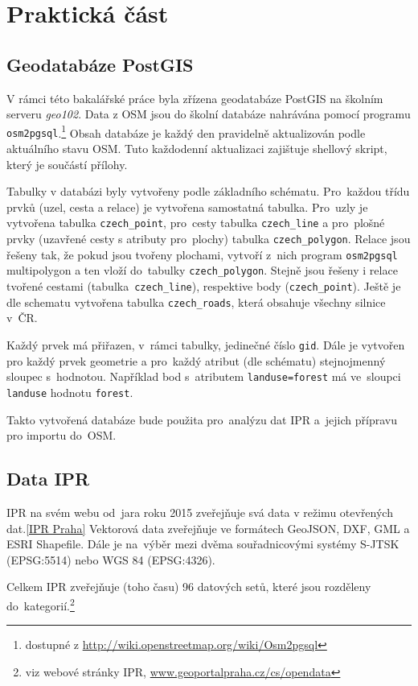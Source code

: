 \chapter{Praktická část}
\label{4-Praktická část}

\section{Geodatabáze PostGIS}
\label{Geodatabaze PostGIS} 
V rámci této bakalářské práce byla zřízena geodatabáze PostGIS na školním
serveru {\em geo102}. Data z OSM jsou do školní databáze nahrávána pomocí programu {\tt osm2pgsql}.\footnote{dostupné z \url{http://wiki.openstreetmap.org/wiki/Osm2pgsql}}
Obsah databáze je každý den pravidelně aktualizován podle aktuálního stavu OSM.
Tuto každodenní aktualizaci zajištuje shellový skript, který je součástí přílohy.

Tabulky v databázi byly vytvořeny podle základního schématu. Pro~každou třídu prvků (uzel, cesta
a relace) je vytvořena samostatná tabulka. Pro~uzly je vytvořena
tabulka {\tt czech\_point}, pro~cesty tabulka {\tt czech\_line} a pro~plošné prvky (uzavřené cesty s atributy
pro~plochy) tabulka {\tt czech\_polygon}. Relace jsou
řešeny tak, že pokud jsou tvořeny plochami, vytvoří z~nich program
{\tt osm2pgsql} multipolygon a ten vloží do~tabulky {\tt czech\_polygon}. Stejně jsou
řešeny i relace tvořené cestami (tabulka~{\tt czech\_line}), respektive body
({\tt czech\_point}). Ještě je dle schematu vytvořena tabulka
{\tt czech\_roads}, která obsahuje všechny silnice v~ČR.

Každý prvek má přiřazen, v~rámci tabulky, jedinečné číslo {\tt gid}.
Dále je vytvořen pro každý prvek geometrie a pro~každý
atribut (dle schématu) stejnojmenný sloupec s~hodnotou. Například
bod s~atributem {\tt landuse=forest} má ve~sloupci {\tt landuse}
hodnotu {\tt forest}.

Takto vytvořená databáze bude použita pro~analýzu dat IPR a~jejich přípravu pro importu do~OSM.

\section{Data IPR}
\label{IPR data}
IPR na svém webu od~jara roku 2015 zveřejňuje svá data v režimu otevřených dat.\ref{IPR Praha}
Vektorová data zveřejňuje ve formátech GeoJSON, DXF, GML a ESRI Shapefile. Dále je na~výběr mezi dvěma
souřadnicovými systémy S-JTSK (EPSG:5514) nebo WGS 84 (EPSG:4326).

Celkem IPR zveřejňuje (toho času) 96 datových setů, které jsou rozděleny
do~kategorií.\footnote{viz webové stránky IPR, \url{www.geoportalpraha.cz/cs/opendata}}

